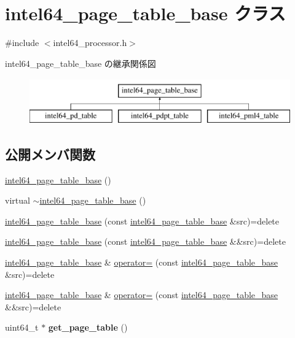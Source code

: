 \hypertarget{classintel64__page__table__base}{}\section{intel64\+\_\+page\+\_\+table\+\_\+base クラス}
\label{classintel64__page__table__base}


{\ttfamily \#include $<$intel64\+\_\+processor.\+h$>$}

intel64\+\_\+page\+\_\+table\+\_\+base の継承関係図\begin{figure}[H]
\begin{center}
\leavevmode
\includegraphics[height=2.000000cm]{classintel64__page__table__base}
\end{center}
\end{figure}
\subsection*{公開メンバ関数}
\begin{DoxyCompactItemize}
\item 
\hyperlink{classintel64__page__table__base_a882c0218105e469495b30aae2ddd03d7}{intel64\+\_\+page\+\_\+table\+\_\+base} ()
\item 
virtual \hyperlink{classintel64__page__table__base_a072ac5b2aedb98b992ecab44641ad8be}{$\sim$intel64\+\_\+page\+\_\+table\+\_\+base} ()
\item 
\hyperlink{classintel64__page__table__base_a6f41188f43304f66eded8e4237f9b9df}{intel64\+\_\+page\+\_\+table\+\_\+base} (const \hyperlink{classintel64__page__table__base}{intel64\+\_\+page\+\_\+table\+\_\+base} \&src)=delete
\item 
\hyperlink{classintel64__page__table__base_af03878ba31fbe3a1c5993f23b5060e6f}{intel64\+\_\+page\+\_\+table\+\_\+base} (const \hyperlink{classintel64__page__table__base}{intel64\+\_\+page\+\_\+table\+\_\+base} \&\&src)=delete
\item 
\hyperlink{classintel64__page__table__base}{intel64\+\_\+page\+\_\+table\+\_\+base} \& \hyperlink{classintel64__page__table__base_a20ad57e3d3901f93e3bd15f00e4449ea}{operator=} (const \hyperlink{classintel64__page__table__base}{intel64\+\_\+page\+\_\+table\+\_\+base} \&src)=delete
\item 
\hyperlink{classintel64__page__table__base}{intel64\+\_\+page\+\_\+table\+\_\+base} \& \hyperlink{classintel64__page__table__base_a4b2fcdc5872bf6d20fe3aca38b78e8ac}{operator=} (const \hyperlink{classintel64__page__table__base}{intel64\+\_\+page\+\_\+table\+\_\+base} \&\&src)=delete
\item 
\hypertarget{classintel64__page__table__base_a05562d9f2b7680c51216cee0ea1f28e1}{}\label{classintel64__page__table__base_a05562d9f2b7680c51216cee0ea1f28e1} 
uint64\+\_\+t $\ast$ {\bfseries get\+\_\+page\+\_\+table} ()
\end{DoxyCompactItemize}
